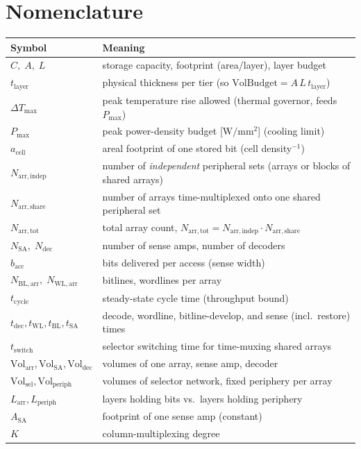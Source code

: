 \documentclass[11pt]{article}
\newcommand{\Nindep}{N_{\mathrm{arr,indep}}}
\newcommand{\Nshare}{N_{\mathrm{arr,share}}}
\newcommand{\Ntot}{N_{\mathrm{arr,tot}}}
\newcommand{\Nsa}{N_{\mathrm{SA}}}
\newcommand{\Ndec}{N_{\mathrm{dec}}}
\newcommand{\Nbl}{N_{\mathrm{BL,arr}}}
\newcommand{\Nwl}{N_{\mathrm{WL,arr}}}
\newcommand{\tcyc}{t_{\mathrm{cycle}}}
\newcommand{\tdec}{t_{\mathrm{dec}}}
\newcommand{\twl}{t_{\mathrm{WL}}}
\newcommand{\tbl}{t_{\mathrm{BL}}}
\newcommand{\tsa}{t_{\mathrm{SA}}}
\newcommand{\tsw}{t_{\mathrm{switch}}}
\newcommand{\Volarr}{\mathrm{Vol}_{\mathrm{arr}}}
\newcommand{\Volsa}{\mathrm{Vol}_{\mathrm{SA}}}
\newcommand{\Voldec}{\mathrm{Vol}_{\mathrm{dec}}}
\newcommand{\Volsel}{\mathrm{Vol}_{\mathrm{sel}}}
\newcommand{\bacc}{b_{\mathrm{acc}}}          %
\newcommand{\Larr}{L_{\mathrm{arr}}}
\newcommand{\Lper}{L_{\mathrm{periph}}}
\newcommand{\Asa}{A_{\mathrm{SA}}}
\newcommand{\acell}{a_{\mathrm{cell}}}
\newcommand{\Volper}{\mathrm{Vol}_{\mathrm{periph}}}
\newcommand{\Pmax}{P_{\max}}
\newcommand{\tlayer}{t_{\mathrm{layer}}}
\begin{document}
\section{Nomenclature}
\label{sec:notation}

\begin{center}
\begin{tabular}{@{}l p{}@{}}
\toprule
Symbol & Meaning \\
\midrule
$C,\;A,\;L$        & storage capacity, footprint (area/layer), layer budget \\
$\tlayer$          & physical thickness per tier (so $\mathrm{VolBudget}=A\,L\,\tlayer$) \\
$\Delta T_{\max}$  & peak temperature rise allowed (thermal governor, feeds $\Pmax$) \\
$\Pmax$            & peak power-density budget [$\mathrm{W/mm^2}$] (cooling limit) \\
$\acell$           & areal footprint of one stored bit (cell density$^{-1}$) \\
$\Nindep$          & number of \emph{independent} peripheral sets (arrays or blocks of shared arrays) \\
$\Nshare$          & number of arrays time-multiplexed onto one shared peripheral set \\
$\Ntot$            & total array count, $\Ntot=\Nindep\cdot\Nshare$ \\
$\Nsa,\;\Ndec$     & number of sense amps, number of decoders \\
$\bacc$            & bits delivered per access (sense width) \\
$\Nbl,\;\Nwl$      & bitlines, wordlines per array \\
$\tcyc$            & steady-state cycle time (throughput bound) \\
$\tdec,\twl,\tbl,\tsa$ & decode, wordline, bitline-develop, and sense (incl.\ restore) times \\
$\tsw$             & selector switching time for time-muxing shared arrays \\
$\Volarr,\Volsa,\Voldec$ & volumes of one array, sense amp, decoder \\
$\Volsel,\Volper$  & volumes of selector network, fixed periphery per array \\
$\Larr,\Lper$      & layers holding bits vs.\ layers holding periphery \\
$\Asa$             & footprint of one sense amp (constant) \\
$K$                & column-multiplexing degree \\

\end{tabular}
\end{center}
\end{document}
